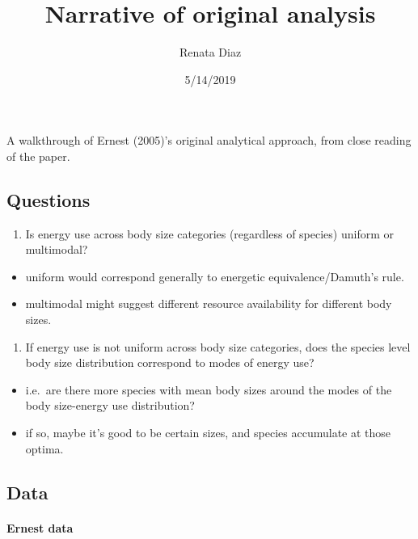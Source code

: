 \documentclass[]{article}
\title{Narrative of original analysis}
\author{Renata Diaz}
\date{5/14/2019}
\providecommand{\tightlist}{%
  \setlength{\itemsep}{0pt}\setlength{\parskip}{0pt}}
\let\oldparagraph\paragraph
\renewcommand{\paragraph}[1]{\oldparagraph{#1}\mbox{}}
\begin{document}
\maketitle

A walkthrough of Ernest (2005)'s original analytical approach, from
close reading of the paper.

\subsection{Questions}\label{questions}

\begin{enumerate}
\def\labelenumi{\arabic{enumi}.}
\tightlist
\item
  Is energy use across body size categories (regardless of species)
  uniform or multimodal?
\end{enumerate}

\begin{itemize}
\tightlist
\item
  uniform would correspond generally to energetic equivalence/Damuth's
  rule.
\item
  multimodal might suggest different resource availability for different
  body sizes.
\end{itemize}

\begin{enumerate}
\def\labelenumi{\arabic{enumi}.}
\setcounter{enumi}{1}
\tightlist
\item
  If energy use is not uniform across body size categories, does the
  species level body size distribution correspond to modes of energy
  use?
\end{enumerate}

\begin{itemize}
\tightlist
\item
  i.e.~are there more species with mean body sizes around the modes of
  the body size-energy use distribution?
\item
  if so, maybe it's good to be certain sizes, and species accumulate at
  those optima.
\end{itemize}

\subsection{Data}\label{data}

\paragraph{Ernest data}\label{ernest-data}
\end{document}
